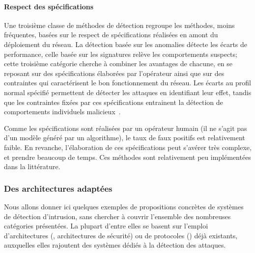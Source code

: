         \paragraph{Respect des spécifications}
Une troisième classe de méthodes de détection regroupe les méthodes, moins fréquentes, basées sur le respect de spécifications réalisées en amont du déploiement du réseau.
La détection basée sur les anomalies détecte les écarts de performance, celle basée sur les signatures relève les comportements suspects; cette troisième catégorie cherche à combiner les avantages de chacune, en se reposant sur des spécifications élaborées par l'opérateur ainsi que sur des contraintes qui caractérisent le bon fonctionnement du réseau.
Les écarts au profil normal spécifié permettent de détecter les attaques en identifiant leur effet, tandis que les contraintes fixées par ces spécifications entrainent la détection de comportements individuels malicieux~\cite{BMS13}.

Comme les spécifications sont réalisées par un opérateur humain (il ne s'agit pas d'un modèle généré par un algorithme), le taux de faux positifs est relativement faible.
En revanche, l'élaboration de ces spécifications peut s'avérer très complexe, et prendre beaucoup de temps.
Ces méthodes sont relativement peu implémentées dans la littérature.

    \subsubsection{Des architectures adaptées}
Nous allons donner ici quelques exemples de propositions concrètes de systèmes de détection d'intrusion, sans chercher à couvrir l'ensemble des nombreuses catégories présentées.
La plupart d'entre elles se basent sur l'emploi d'architectures (, architectures de sécurité) ou de protocoles () déjà existants, auxquelles elles rajoutent des systèmes dédiés à la détection des attaques.


